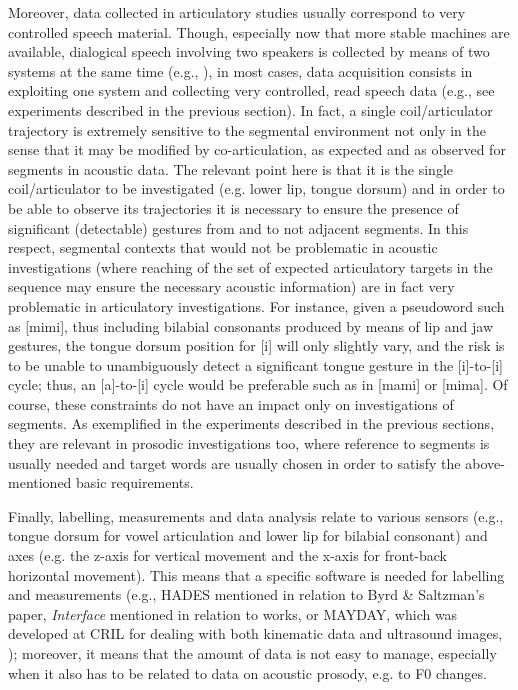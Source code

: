 \documentclass[output=paper]{langsci/langscibook}
\begin{document}
Moreover, data collected in articulatory studies usually correspond to very controlled speech material. Though, especially now that more stable machines are available, dialogical speech involving two speakers is collected by means of two systems at the same time (e.g., \citealt{Geng2013}), in most cases, data acquisition consists in exploiting one system and collecting very controlled, read speech data (e.g., see experiments described in the previous section). In fact, a single coil\slash articulator trajectory is extremely sensitive to the segmental environment not only in the sense that it may be modified by co-articulation, as expected and as observed for segments in acoustic data. The relevant point here is that it is the single coil\slash articulator to be investigated (e.g. lower lip, tongue dorsum) and in order to be able to observe its trajectories it is necessary to ensure the presence of significant (detectable) gestures from and to not adjacent segments. In this respect, segmental contexts that would not be problematic in acoustic investigations (where reaching of the set of expected articulatory targets in the sequence may ensure the necessary acoustic information) are in fact very problematic in articulatory investigations. For instance, given a pseudoword such as [mimi], thus including bilabial consonants produced by means of lip and jaw gestures, the tongue dorsum position for [i] will only slightly vary, and the risk is to be unable to unambiguously detect a significant tongue gesture in the [i]-to-[i] cycle; thus, an [a]-to-[i] cycle would be preferable such as in [mami] or [mima]. Of course, these constraints do not have an impact only on investigations of segments. As exemplified in the experiments described in the previous sections, they are relevant in prosodic investigations too, where reference to segments is usually needed and target words are usually chosen in order to satisfy the above-mentioned basic requirements.

Finally, labelling, measurements and data analysis relate to various sensors (e.g., tongue dorsum for vowel articulation and lower lip for bilabial consonant) and axes (e.g. the z-axis for vertical movement and the x-axis for front-back horizontal movement). This means that a specific software is needed for labelling and measurements (e.g., HADES mentioned in relation to Byrd \& Saltzman’s \citeyear{Byrd1998} paper, \textit{Interface} mentioned in relation to \citealt{Avesani2007,Avesani2009} works, or MAYDAY, which was developed at CRIL for dealing with both kinematic data and ultrasound images, \citealt{Sigona2015}); moreover, it means that the amount of data is not easy to manage, especially when it also has to be related to data on acoustic prosody, e.g. to F0 changes.
\end{document}
